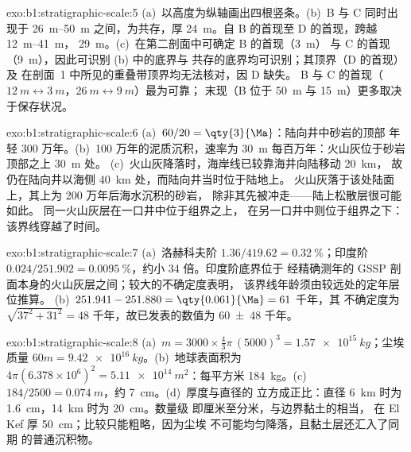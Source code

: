 \begin{solution}{exo:b1:stratigraphic-scale:5}
(a)~以高度为纵轴画出四根竖条。(b)~B 与 C 同时出现于
\qtyrange{26}{50}{m} 之间，为共存，厚 \qty{24}{m}。自 B 的首现至 D 的首现，跨越 \qtyrange{12}{41}{m}，
\qty{29}{m}。(c)~在第二剖面中可确定 B 的首现（\qty{3}{m}）
与 C 的首现（\qty{9}{m}），因此可识别 (b) 中的底界与
共存的底界均可识别；其顶界（D 的首现）及
在剖面~1 中所见的重叠带顶界均无法核对，因 D 缺失。
B 与 C 的首现（$\qty{12}{m} \leftrightarrow
\qty{3}{m}$，$\qty{26}{m} \leftrightarrow \qty{9}{m}$）最为可靠；
末现（B 位于 \qty{50}{m} 与 \qty{15}{m}）更多取决于保存状况。
\end{solution}

\begin{solution}{exo:b1:stratigraphic-scale:6}
(a)~$60/20 = \qty{3}{\Ma}$：陆向井中砂岩的顶部
年轻 300 万年。(b)~100 万年的泥质沉积，速率为 \qty{30}{m}
每百万年：火山灰位于砂岩顶部之上 \qty{30}{m} 处。
(c)~火山灰降落时，海岸线已较靠海井向陆移动 \qty{20}{km}，
故仍在陆向井以海侧 \qty{40}{km} 处，而陆向井当时位于陆地上。
火山灰落于该处陆面上，其上为 200 万年后海水沉积的砂岩，
除非其先被冲走——陆上松散层很可能如此。
同一火山灰层在一口井中位于组界之上，
在另一口井中则位于组界之下：该界线穿越了时间。
\end{solution}

\begin{solution}{exo:b1:stratigraphic-scale:7}
(a)~洛赫科夫阶 $1.36/419.62 = \qty{0.32}{\%}$；印度阶 $0.024/251.902 =
\qty{0.0095}{\%}$，约小 34 倍。印度阶底界位于
经精确测年的 GSSP 剖面本身的火山灰层之间；较大的不确定度表明，
该界线年龄须由较远处的定年层位推算。
(b)~$251.941 - 251.880 = \qty{0.061}{\Ma} = 61$ 千年，其
不确定度为 $\sqrt{37^2 + 31^2} = 48$ 千年，故已发表的数值为
\num[uncertainty-mode=separate]{60 \pm 48} 千年。
\end{solution}

\begin{solution}{exo:b1:stratigraphic-scale:8}
(a)~$m = 3000 \times \frac43\pi\,(5000)^3 = \qty{1.57e15}{kg}$；尘埃
质量 $60m = \qty{9.42e16}{kg}$。(b)~地球表面积为 $4\pi(6.378\times10^6)^2
= \qty{5.11e14}{m^2}$：每平方米 \qty{184}{kg}。(c)~$184/2500 =
\qty{0.074}{m}$，约 \qty{7}{cm}。(d)~厚度与直径的
立方成正比：直径 \qty{6}{km} 时为 \qty{1.6}{cm}，\qty{14}{km} 时为 \qty{20}{cm}。数量级
即厘米至分米，与边界黏土的相当，
在 El Kef 厚 \qty{50}{cm}；比较只能粗略，因为尘埃
不可能均匀降落，且黏土层还汇入了同期
的普通沉积物。
\end{solution}

